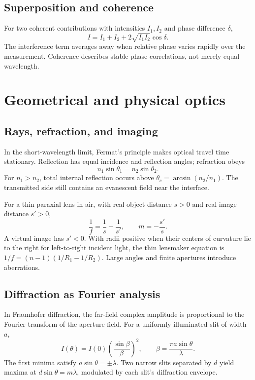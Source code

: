 \documentclass[11pt,oneside]{book}
\theoremstyle{reviewstyle}
\begin{document}
\section{Superposition and coherence}
For two coherent contributions with intensities $I_1,I_2$ and phase difference $\delta$,
\begin{equation}I=I_1+I_2+2\sqrt{I_1I_2}\cos\delta.\end{equation}
The interference term averages away when relative phase varies rapidly over the measurement. Coherence describes stable phase correlations, not merely equal wavelength.

\chapter{Geometrical and physical optics}
\section{Rays, refraction, and imaging}
In the short-wavelength limit, Fermat's principle makes optical travel time stationary. Reflection has equal incidence and reflection angles; refraction obeys
\begin{equation}n_1\sin\theta_1=n_2\sin\theta_2.\end{equation}
For $n_1>n_2$, total internal reflection occurs above $\theta_c=\arcsin(n_2/n_1)$. The transmitted side still contains an evanescent field near the interface.

For a thin paraxial lens in air, with real object distance $s>0$ and real image distance $s'>0$,
\begin{equation}\frac1f=\frac1s+\frac1{s'},\qquad m=-\frac{s'}s.\end{equation}
A virtual image has $s'<0$. With radii positive when their centers of curvature lie to the right for left-to-right incident light, the thin lensmaker equation is
$1/f=(n-1)(1/R_1-1/R_2)$. Large angles and finite apertures introduce aberrations.
\section{Diffraction as Fourier analysis}
In Fraunhofer diffraction, the far-field complex amplitude is proportional to the Fourier transform of the aperture field. For a uniformly illuminated slit of width $a$,
\begin{equation}
I(\theta)=I(0)\left(\frac{\sin\beta}{\beta}\right)^2,
\qquad \beta=\frac{\pi a\sin\theta}{\lambda}.
\end{equation}
The first minima satisfy $a\sin\theta=\pm\lambda$. Two narrow slits separated by $d$ yield maxima at $d\sin\theta=m\lambda$, modulated by each slit's diffraction envelope.
\end{document}
